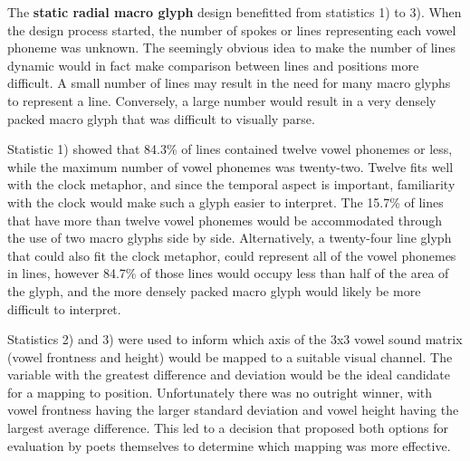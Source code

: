 The \textbf{static radial macro glyph} design benefitted from statistics 1) to 3). 
When the design process started, the number of spokes or lines representing each vowel phoneme was unknown. 
The seemingly obvious idea to make the number of lines dynamic would in fact make comparison between lines and positions more difficult. 
A small number of lines may result in the need for many macro glyphs to represent a line.
Conversely, a large number would result in a very densely packed macro glyph that was difficult to visually parse.

Statistic 1) showed that 84.3\% of lines contained twelve vowel phonemes or less, while the maximum number of vowel phonemes was twenty-two. 
Twelve fits well with the clock metaphor, and since the temporal aspect is important, familiarity with the clock would make such a glyph easier to interpret. 
The 15.7\% of lines that have more than twelve vowel phonemes would be accommodated through the use of two macro glyphs side by side. 
Alternatively, a twenty-four line glyph that could also fit the clock metaphor, could represent all of the vowel phonemes in lines, however 84.7\% of those lines would occupy less than half of the area of the glyph, and the more densely packed macro glyph would likely be more difficult to interpret.

Statistics 2) and 3) were used to inform which axis of the 3x3 vowel sound matrix (vowel frontness and height) would be mapped to a suitable visual channel. 
The variable with the greatest difference and deviation would be the ideal candidate for a mapping to position.
Unfortunately there was no outright winner, with vowel frontness having the larger standard deviation and vowel height having the largest average difference.
This led to a decision that proposed both options for evaluation by poets themselves to determine which mapping was more effective.
 
